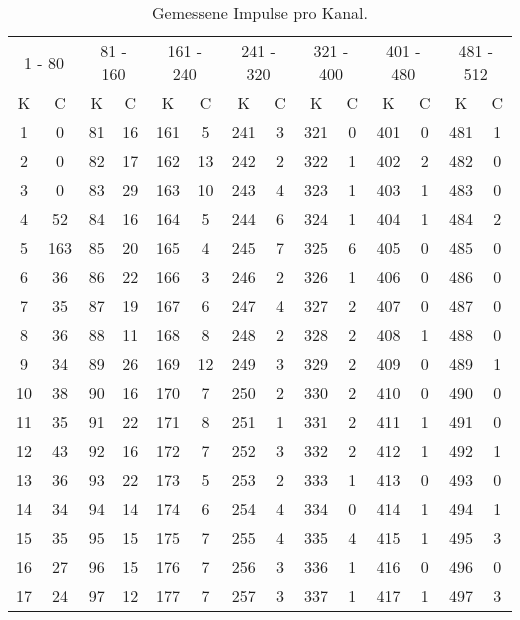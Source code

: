 \begin{table}
 \centering
 \caption{Gemessene Impulse pro Kanal.}
 \label{tab:Messwerte1}
 \begin{tabular}{c|c||c|c||c|c||c|c||c|c||c|c||c|c}
 \toprule
 \multicolumn{2}{c}{1 - 80}    & \multicolumn{2}{c}{81 - 160}  &
 \multicolumn{2}{c}{161 - 240} & \multicolumn{2}{c}{241 - 320} &
 \multicolumn{2}{c}{321 - 400} & \multicolumn{2}{c}{401 - 480} &
 \multicolumn{2}{c}{481 - 512} \\
\cmidrule(lr){1-2}\cmidrule(lr){3-4}\cmidrule(lr){5-6}\cmidrule(lr){7-8}\cmidrule(lr){9-10}\cmidrule(lr){11-12}\cmidrule(lr){13-14}
 K & C & K & C & K & C & K & C & K & C & K & C & K & C \\
 \midrule
 1  & 0   & 81  & 16 & 161 &  5 & 241 &  3 & 321 & 0 & 401 & 0 & 481 & 1\\
 2  & 0   & 82  & 17 & 162 & 13 & 242 &  2 & 322 & 1 & 402 & 2 & 482 & 0\\
 3  & 0   & 83  & 29 & 163 & 10 & 243 &  4 & 323 & 1 & 403 & 1 & 483 & 0\\
 4  & 52  & 84  & 16 & 164 &  5 & 244 &  6 & 324 & 1 & 404 & 1 & 484 & 2\\
 5  & 163 & 85  & 20 & 165 &  4 & 245 &  7 & 325 & 6 & 405 & 0 & 485 & 0\\
 6  & 36  & 86  & 22 & 166 &  3 & 246 &  2 & 326 & 1 & 406 & 0 & 486 & 0\\
 7  & 35  & 87  & 19 & 167 &  6 & 247 &  4 & 327 & 2 & 407 & 0 & 487 & 0\\
 8  & 36  & 88  & 11 & 168 &  8 & 248 &  2 & 328 & 2 & 408 & 1 & 488 & 0\\
 9  & 34  & 89  & 26 & 169 & 12 & 249 &  3 & 329 & 2 & 409 & 0 & 489 & 1\\
 10 & 38  & 90  & 16 & 170 &  7 & 250 &  2 & 330 & 2 & 410 & 0 & 490 & 0\\
 11 & 35  & 91  & 22 & 171 &  8 & 251 &  1 & 331 & 2 & 411 & 1 & 491 & 0\\
 12 & 43  & 92  & 16 & 172 &  7 & 252 &  3 & 332 & 2 & 412 & 1 & 492 & 1\\
 13 & 36  & 93  & 22 & 173 &  5 & 253 &  2 & 333 & 1 & 413 & 0 & 493 & 0\\
 14 & 34  & 94  & 14 & 174 &  6 & 254 &  4 & 334 & 0 & 414 & 1 & 494 & 1\\
 15 & 35  & 95  & 15 & 175 &  7 & 255 &  4 & 335 & 4 & 415 & 1 & 495 & 3\\
 16 & 27  & 96  & 15 & 176 &  7 & 256 &  3 & 336 & 1 & 416 & 0 & 496 & 0\\
 17 & 24  & 97  & 12 & 177 &  7 & 257 &  3 & 337 & 1 & 417 & 1 & 497 & 3\\

\end{tabular}
\end{table}
